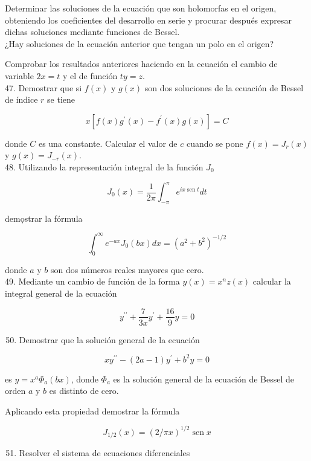 \documentclass[10pt]{article}
\theoremstyle{plain}
\theoremstyle{definition}
\theoremstyle{remark}
\begin{document}
Determinar las soluciones de la ecuación que son holomorfas en el origen, obteniendo los coeficientes del desarrollo en serie y procurar después expresar dichas soluciones mediante funciones de Bessel.\\
¿Hay soluciones de la ecuación anterior que tengan un polo en el origen?

Comprobar los resultados anteriores haciendo en la ecuación el cambio de variable $2 x=t$ y el de función $t y=z$.\\
47. Demostrar que si $f(x)$ y $g(x)$ son dos soluciones de la ecuación de Bessel de índice $r$ se tiene

$$
x\left[f(x) g^{\prime}(x)-f^{\prime}(x) g(x)\right]=C
$$

donde $C$ es una constante. Calcular el valor de $c$ cuando se pone $f(x)=J_{r}(x)$ y $g(x)=J_{-r}(x)$.\\
48. Utilizando la representación integral de la función $J_{0}$

$$
J_{0}(x)=\frac{1}{2 \pi} \int_{-\pi}^{\pi} e^{i x \operatorname{sen} t} d t
$$

demọstrar la fórmula

$$
\int_{0}^{\infty} e^{-a x} J_{0}(b x) d x=\left(a^{2}+b^{2}\right)^{-1 / 2}
$$

donde $a$ y $b$ son dos números reales mayores que cero.\\
49. Mediante un cambio de función de la forma $y(x)=x^{n} z(x)$ calcular la integral general de la ecuación

$$
y^{\prime \prime}+\frac{7}{3 x} y^{\prime}+\frac{16}{9} y=0
$$

\begin{enumerate}
  \setcounter{enumi}{49}
  \item Demostrar que la solución general de la ecuación
\end{enumerate}

$$
x y^{\prime \prime}-(2 a-1) y^{\prime}+b^{2} y=0
$$

es $y=x^{a} \Phi_{a}(b x)$, donde $\Phi_{a}$ es la solución general de la ecuación de Bessel de orden $a$ y $b$ es distinto de cero.

Aplicando esta propiedad demostrar la fórmula

$$
J_{1 / 2}(x)=(2 / \pi x)^{1 / 2} \operatorname{sen} x
$$

\begin{enumerate}
  \setcounter{enumi}{50}
  \item Resolver el sistema de ecuaciones diferenciales
\end{enumerate}
\end{document}
